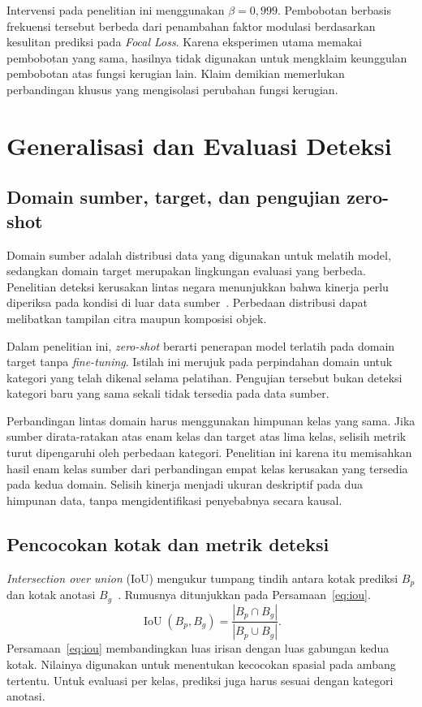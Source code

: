 Intervensi pada penelitian ini menggunakan $\beta=0{,}999$. Pembobotan berbasis frekuensi tersebut berbeda dari penambahan faktor modulasi berdasarkan kesulitan prediksi pada \textit{Focal Loss}. Karena eksperimen utama memakai pembobotan yang sama, hasilnya tidak digunakan untuk mengklaim keunggulan pembobotan atas fungsi kerugian lain. Klaim demikian memerlukan perbandingan khusus yang mengisolasi perubahan fungsi kerugian.

\section{Generalisasi dan Evaluasi Deteksi}
\subsection{Domain sumber, target, dan pengujian zero-shot}
Domain sumber adalah distribusi data yang digunakan untuk melatih model, sedangkan domain target merupakan lingkungan evaluasi yang berbeda. Penelitian deteksi kerusakan lintas negara menunjukkan bahwa kinerja perlu diperiksa pada kondisi di luar data sumber~\cite{arya2021deep,Arya2024846}. Perbedaan distribusi dapat melibatkan tampilan citra maupun komposisi objek.

Dalam penelitian ini, \textit{zero-shot} berarti penerapan model terlatih pada domain target tanpa \textit{fine-tuning}. Istilah ini merujuk pada perpindahan domain untuk kategori yang telah dikenal selama pelatihan. Pengujian tersebut bukan deteksi kategori baru yang sama sekali tidak tersedia pada data sumber.

Perbandingan lintas domain harus menggunakan himpunan kelas yang sama. Jika sumber dirata-ratakan atas enam kelas dan target atas lima kelas, selisih metrik turut dipengaruhi oleh perbedaan kategori. Penelitian ini karena itu memisahkan hasil enam kelas sumber dari perbandingan empat kelas kerusakan yang tersedia pada kedua domain. Selisih kinerja menjadi ukuran deskriptif pada dua himpunan data, tanpa mengidentifikasi penyebabnya secara kausal.

\subsection{Pencocokan kotak dan metrik deteksi}
\textit{Intersection over union} (IoU) mengukur tumpang tindih antara kotak prediksi $B_p$ dan kotak anotasi $B_g$~\cite{Li2024,Zeng2024}. Rumusnya ditunjukkan pada Persamaan~\eqref{eq:iou}.
\begin{equation}
\operatorname{IoU}(B_p,B_g)=\frac{|B_p\cap B_g|}{|B_p\cup B_g|}.
\label{eq:iou}
\end{equation}
Persamaan~\eqref{eq:iou} membandingkan luas irisan dengan luas gabungan kedua kotak. Nilainya digunakan untuk menentukan kecocokan spasial pada ambang tertentu. Untuk evaluasi per kelas, prediksi juga harus sesuai dengan kategori anotasi.

